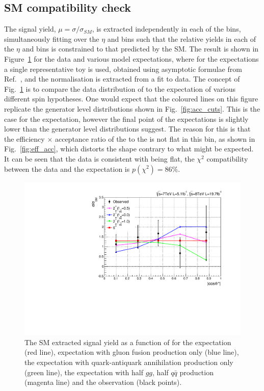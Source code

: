 \subsection{SM compatibility check}
The signal yield, $\mu=\sigma/\sigma_{SM}$, is extracted independently in each of the \abscostheta bins, 
simultaneously fitting over the $\eta$ and \rnine bins such that the relative yields in each of the $\eta$ and \rnine 
bins is constrained to that predicted by the SM. The result is shown in Figure~\ref{fig:channelcomp} for the data and various \twomp model expectations, where for the expectations a single representative toy is used, obtained using asymptotic formulae from Ref.~\cite{asymptotic_form}, and the normalisation is extracted from a fit to data. The concept of Fig.~\ref{fig:channelcomp} is to compare the data distribution of \abscostheta to the expectation of various different spin hypotheses. One would expect that the coloured lines on this figure replicate the generator level distributions shown in Fig.~\ref{fig:acc_cuts}. This is the case for the \SM \zerop expectation, however the final point of the \twomp expectations is slightly lower than the generator level distributions suggest. The reason for this is that the efficiency $\times$ acceptance ratio of the \zerop to the \twomp is not flat in this bin, as shown in Fig.~\ref{fig:eff_acc}, which distorts the shape contrary to what might be expected. It can be seen that the data is consistent with being flat, the $\chi^{2}$ compatibility between the data and the \SM expectation is $p(\chi^{2})=86\%$.

\begin{figure}
  \begin{center}
    \includegraphics[width=0.8\linewidth]{results/plots/chcomp.pdf}
    \caption[The \acs{SM} signal strength extraction in bins of \abscostheta for the spin analysis]{The SM extracted signal yield as a function of \abscostheta for the \zerop expectation (red line), \twomp expectation with gluon fusion production only (blue line), the \twomp expectation with quark-antiquark annihilation production only (green line), the \twomp expectation with half $gg$, half $q\bar{q}$ production (magenta line) and the observation (black points).}
    \label{fig:channelcomp}
  \end{center}
\end{figure}

